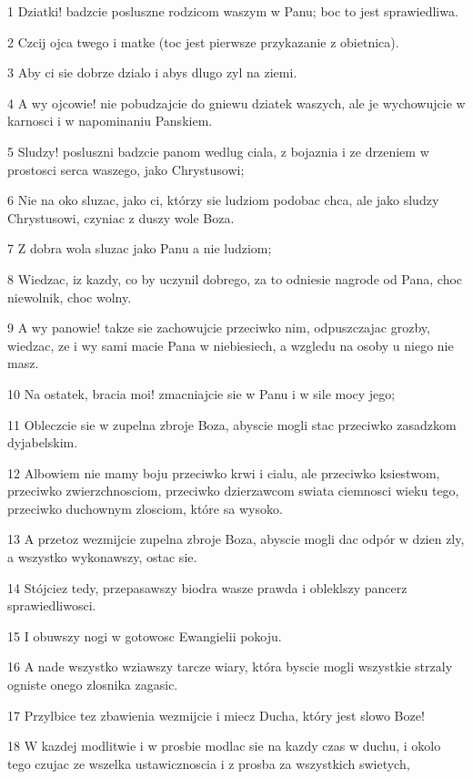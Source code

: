 \par 1 Dziatki! badzcie posluszne rodzicom waszym w Panu; boc to jest sprawiedliwa.
\par 2 Czcij ojca twego i matke (toc jest pierwsze przykazanie z obietnica).
\par 3 Aby ci sie dobrze dzialo i abys dlugo zyl na ziemi.
\par 4 A wy ojcowie! nie pobudzajcie do gniewu dziatek waszych, ale je wychowujcie w karnosci i w napominaniu Panskiem.
\par 5 Sludzy! posluszni badzcie panom wedlug ciala, z bojaznia i ze drzeniem w prostosci serca waszego, jako Chrystusowi;
\par 6 Nie na oko sluzac, jako ci, którzy sie ludziom podobac chca, ale jako sludzy Chrystusowi, czyniac z duszy wole Boza.
\par 7 Z dobra wola sluzac jako Panu a nie ludziom;
\par 8 Wiedzac, iz kazdy, co by uczynil dobrego, za to odniesie nagrode od Pana, choc niewolnik, choc wolny.
\par 9 A wy panowie! takze sie zachowujcie przeciwko nim, odpuszczajac grozby, wiedzac, ze i wy sami macie Pana w niebiesiech, a wzgledu na osoby u niego nie masz.
\par 10 Na ostatek, bracia moi! zmacniajcie sie w Panu i w sile mocy jego;
\par 11 Obleczcie sie w zupelna zbroje Boza, abyscie mogli stac przeciwko zasadzkom dyjabelskim.
\par 12 Albowiem nie mamy boju przeciwko krwi i cialu, ale przeciwko ksiestwom, przeciwko zwierzchnosciom, przeciwko dzierzawcom swiata ciemnosci wieku tego, przeciwko duchownym zlosciom, które sa wysoko.
\par 13 A przetoz wezmijcie zupelna zbroje Boza, abyscie mogli dac odpór w dzien zly, a wszystko wykonawszy, ostac sie.
\par 14 Stójciez tedy, przepasawszy biodra wasze prawda i obleklszy pancerz sprawiedliwosci.
\par 15 I obuwszy nogi w gotowosc Ewangielii pokoju.
\par 16 A nade wszystko wziawszy tarcze wiary, która byscie mogli wszystkie strzaly ogniste onego zlosnika zagasic.
\par 17 Przylbice tez zbawienia wezmijcie i miecz Ducha, który jest slowo Boze!
\par 18 W kazdej modlitwie i w prosbie modlac sie na kazdy czas w duchu, i okolo tego czujac ze wszelka ustawicznoscia i z prosba za wszystkich swietych,

